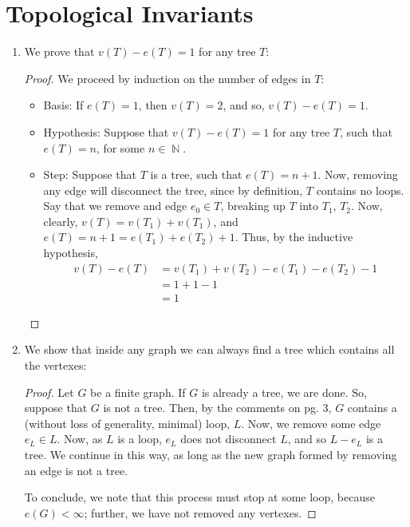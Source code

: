 \documentclass{book}
\DeclareMathOperator*{\N}{\mathbb{N}}
\begin{document}
\section{Topological Invariants}
\begin{enumerate}

    \item We prove that $v(T) - e(T) = 1$ for any tree $T$: 
        \begin{proof} We proceed by induction on the number of edges in $T$: 
            \begin{itemize}
                \item Basis: If $e(T) =1$, then $v(T) = 2$, and so,  $v(T) - e(T) = 1$.
                \item Hypothesis: Suppose that  $v(T) - e(T) = 1$ for any tree $T$, such that $e(T) = n$, for some $n \in \N$.
                \item Step: Suppose that $T$ is a tree, such that $e(T) = n+1$. Now, removing any edge will disconnect the tree, since by definition, $T$ contains no loops. Say that we remove and edge $e_0 \in T$, breaking up $T$ into $T_1$, $T_2$. Now, clearly, $v(T) = v(T_1) + v(T_1)$, and $e(T) = n+1 = e(T_1) +e(T_2) +1$. Thus, by the inductive hypothesis,
                    \begin{align*}
                        v(T) - e(T) & = v(T_1) + v(T_2) - e(T_1) - e(T_2) - 1 \\
                        & = 1 + 1 - 1 \\
                        & = 1
                    \end{align*}
            \end{itemize}
        \end{proof}

    \item We show that inside any graph we can always find a tree which contains all the vertexes: 
        \begin{proof} Let $G$ be a finite graph. If $G$ is already a tree, we are done. So, suppose that $G$ is not a tree. Then, by the comments on pg. $3$, $G$ contains a (without loss of generality, minimal) loop, $L$. Now, we remove some edge $e_L \in L$. Now, as $L$ is a loop, $e_L$ does not disconnect $L$, and so $L - e_L$ is a tree. We continue in this way, as long as the new graph formed by removing an edge is not a tree.
            \par To conclude, we note that this process must stop at some loop, because $e(G) < \infty$; further, we have not removed any vertexes. 
        \end{proof}


\end{enumerate}
\end{document}
